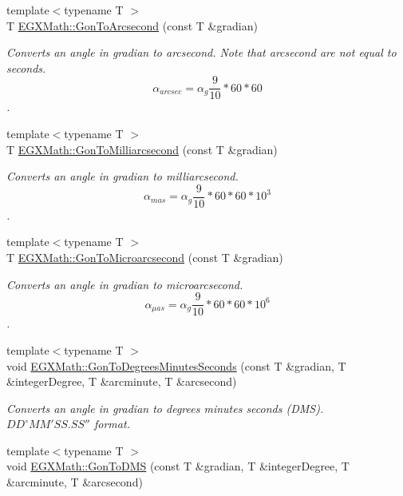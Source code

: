 \begin{DoxyCompactItemize}
{\footnotesize template$<$typename T $>$ }\\T \mbox{\hyperlink{group___e_g_x_math-_conversions-_angle_conversions-_gon_gad4f34877c74cc444e7b741b99cd20d5a}{E\+G\+X\+Math\+::\+Gon\+To\+Arcsecond}} (const T \&gradian)
\begin{DoxyCompactList}\small\item\em Converts an angle in gradian to arcsecond. Note that arcsecond are not equal to seconds. \[\alpha_{arcsec}=\alpha_{g}\frac{9}{10} * 60 * 60\]. \end{DoxyCompactList}\item 
{\footnotesize template$<$typename T $>$ }\\T \mbox{\hyperlink{group___e_g_x_math-_conversions-_angle_conversions-_gon_ga63013f99af7ec2b9628b8b87eb2e2a92}{E\+G\+X\+Math\+::\+Gon\+To\+Milliarcsecond}} (const T \&gradian)
\begin{DoxyCompactList}\small\item\em Converts an angle in gradian to milliarcsecond. \[\alpha_{mas}=\alpha_{g}\frac{9}{10} * 60 * 60 * 10^3\]. \end{DoxyCompactList}\item 
{\footnotesize template$<$typename T $>$ }\\T \mbox{\hyperlink{group___e_g_x_math-_conversions-_angle_conversions-_gon_gae3f14ff3441def6d88fed69f2466cf82}{E\+G\+X\+Math\+::\+Gon\+To\+Microarcsecond}} (const T \&gradian)
\begin{DoxyCompactList}\small\item\em Converts an angle in gradian to microarcsecond. \[\alpha_{\mu as}=\alpha_{g}\frac{9}{10} * 60 * 60 * 10^6\]. \end{DoxyCompactList}\item 
{\footnotesize template$<$typename T $>$ }\\void \mbox{\hyperlink{group___e_g_x_math-_conversions-_angle_conversions-_gon_gabd1dfe541d8caf9ee5ed261fe6f08261}{E\+G\+X\+Math\+::\+Gon\+To\+Degrees\+Minutes\+Seconds}} (const T \&gradian, T \&integer\+Degree, T \&arcminute, T \&arcsecond)
\begin{DoxyCompactList}\small\item\em Converts an angle in gradian to degrees minutes seconds (D\+MS). ${DD}^{\circ}{MM}'{SS.SS}''$ format. \end{DoxyCompactList}\item 
{\footnotesize template$<$typename T $>$ }\\void \mbox{\hyperlink{group___e_g_x_math-_conversions-_angle_conversions-_gon_ga14b45561114365c4707d40e3b8b57667}{E\+G\+X\+Math\+::\+Gon\+To\+D\+MS}} (const T \&gradian, T \&integer\+Degree, T \&arcminute, T \&arcsecond)

\end{DoxyCompactItemize}
